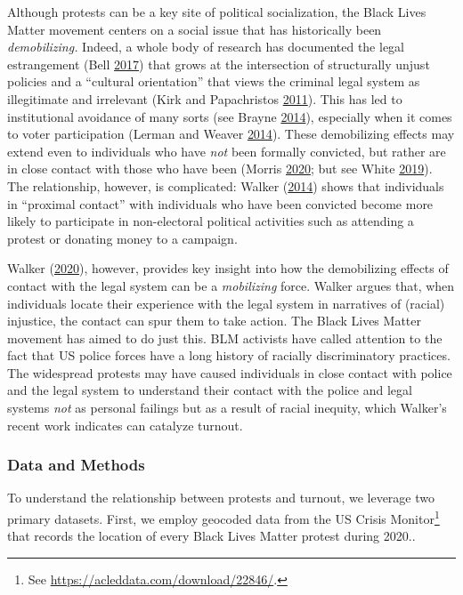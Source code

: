 \documentclass[
  12pt,
]{article}
\begin{document}
Although protests can be a key site of political socialization, the Black Lives Matter movement centers on a social issue that has historically been \emph{demobilizing.} Indeed, a whole body of research has documented the legal estrangement (Bell \protect\hyperlink{ref-Bell2017}{2017}) that grows at the intersection of structurally unjust policies and a ``cultural orientation'' that views the criminal legal system as illegitimate and irrelevant (Kirk and Papachristos \protect\hyperlink{ref-Kirk2011}{2011}). This has led to institutional avoidance of many sorts (see Brayne \protect\hyperlink{ref-Brayne2014}{2014}), especially when it comes to voter participation (Lerman and Weaver \protect\hyperlink{ref-Lerman2014}{2014}). These demobilizing effects may extend even to individuals who have \emph{not} been formally convicted, but rather are in close contact with those who have been (Morris \protect\hyperlink{ref-Morris2020}{2020}; but see White \protect\hyperlink{ref-White2019}{2019}). The relationship, however, is complicated: Walker (\protect\hyperlink{ref-Walker2014}{2014}) shows that individuals in ``proximal contact'' with individuals who have been convicted become more likely to participate in non-electoral political activities such as attending a protest or donating money to a campaign.

Walker (\protect\hyperlink{ref-Walker2020}{2020}), however, provides key insight into how the demobilizing effects of contact with the legal system can be a \emph{mobilizing} force. Walker argues that, when individuals locate their experience with the legal system in narratives of (racial) injustice, the contact can spur them to take action. The Black Lives Matter movement has aimed to do just this. BLM activists have called attention to the fact that US police forces have a long history of racially discriminatory practices. The widespread protests may have caused individuals in close contact with police and the legal system to understand their contact with the police and legal systems \emph{not} as personal failings but as a result of racial inequity, which Walker's recent work indicates can catalyze turnout.

\hypertarget{data-and-methods}{%
\subsubsection*{Data and Methods}\label{data-and-methods}}

To understand the relationship between protests and turnout, we leverage two primary datasets. First, we employ geocoded data from the US Crisis Monitor\footnote{See \url{https://acleddata.com/download/22846/}.} that records the location of every Black Lives Matter protest during 2020..
\end{document}
